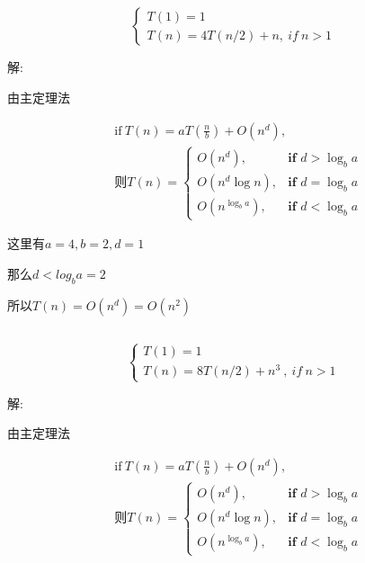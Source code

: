 \documentclass{article}
\begin{document}
\subsection{}

$$
\left\{
\begin{array}{l}
T(1) = 1\\
T (n) = 4T (n/2) + n,\ if\ n > 1
\end{array}
\right.
$$

解:

\quad\quad\quad\quad 由主定理法

\begin{align*}
    &\text{if}\  T(n) = a T(\frac{n}{b}) + O(n^d),\\
    &则T(n) = 
    \begin{cases}
        O(n^d), & \textbf{if } d > \log_ba\\
        O(n^d\log n),& \textbf{if } d = \log_ba\\
        O(n^{\log_ba}), & \textbf{if } d < \log_ba
    \end{cases}
\end{align*}

\quad\quad\quad\quad 这里有$a = 4, b = 2, d = 1$

\quad\quad\quad\quad 那么$d < log_b a = 2$

\quad\quad\quad\quad 所以$T(n) = O(n^d) = O(n^2)$



\subsection{}

$$
\left\{
\begin{array}{l}
T(1) = 1\\
T(n) = 8T(n/2) +n^3\ ,\ if \ n>1
\end{array}
\right.
$$


解:

\quad\quad\quad\quad 由主定理法

\begin{align*}
    &\text{if}\  T(n) = a T(\frac{n}{b}) + O(n^d),\\
    &则T(n) = 
    \begin{cases}
        O(n^d), & \textbf{if } d > \log_ba\\
        O(n^d\log n),& \textbf{if } d = \log_ba\\
        O(n^{\log_ba}), & \textbf{if } d < \log_ba
    \end{cases}
\end{align*}
\end{document}
